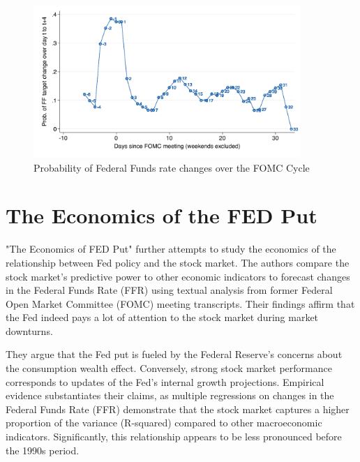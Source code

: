 \label{cies19_fig3A}
\begin{figure}[h]
    \centering
    \includegraphics[width=0.9\textwidth]{figures/cies19/fig3A}
    \caption{Probability of Federal Funds rate changes over the FOMC Cycle \parencite{cieslak_stock_2019} }
\end{figure}

\pagebreak

\section{The Economics of the FED Put}
"The Economics of FED Put" further attempts to study the economics of the relationship between Fed policy and the stock market. The authors compare the stock market's predictive power to other economic indicators to forecast changes in the Federal Funds Rate (FFR) using textual analysis from former Federal Open Market Committee (FOMC) meeting transcripts. Their findings affirm that the Fed indeed pays a lot of attention to the stock market during market downturns.


They argue that the Fed put is fueled by the Federal Reserve's concerns about the consumption wealth effect. Conversely, strong stock market performance corresponds to updates of the Fed’s internal growth projections. Empirical evidence substantiates their claims, as multiple regressions on changes in the Federal Funds Rate (FFR) demonstrate that the stock market captures a higher proportion of the variance (R-squared) compared to other macroeconomic indicators. Significantly, this relationship appears to be less pronounced before the 1990s period.  \parencite{cieslak_economics_2021}

